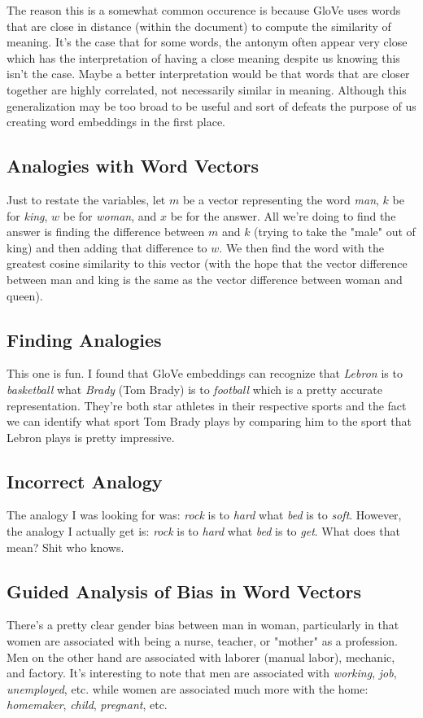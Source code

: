 \documentclass[12pt]{article}
\begin{document}
The reason this is a somewhat common occurence is because GloVe uses words that are close in distance 
(within the document) to compute the similarity of meaning. It's the case that for some words, the antonym 
often appear very close which has the interpretation of having a close meaning despite us knowing this isn't
the case. Maybe a better interpretation would be that words that are closer together are highly correlated, 
not necessarily similar in meaning. Although this generalization may be too broad to be useful and 
sort of defeats the purpose of us creating word embeddings in the first place. 

\subsection{Analogies with Word Vectors}
Just to restate the variables, let $m$ be a vector representing the word \emph{man}, $k$ be for 
\emph{king}, $w$ be for \emph{woman}, and $x$ be for the answer. All we're doing to find the answer
is finding the difference between $m$ and $k$ (trying to take the "male" out of king) and then adding
that difference to $w$. We then find the word with the greatest
cosine similarity to this vector (with the hope that the vector difference between man and king is the 
same as the vector difference between woman and queen). 

\subsection{Finding Analogies}
This one is fun. I found that GloVe embeddings can recognize that \emph{Lebron} is to \emph{basketball}
what \emph{Brady} (Tom Brady) is to \emph{football} which is a pretty accurate representation. They're 
both star athletes in their respective sports and the fact we can identify what sport Tom Brady plays 
by comparing him to the sport that Lebron plays is pretty impressive. 

\subsection{Incorrect Analogy}
The analogy I was looking for was: \emph{rock} is to \emph{hard} what \emph{bed} is to \emph{soft}. 
However, the analogy I actually get is: \emph{rock} is to \emph{hard} what \emph{bed} is to \emph{get}.
What does that mean? Shit who knows. 

\subsection{Guided Analysis of Bias in Word Vectors}
There's a pretty clear gender bias between man in woman, particularly in that women are associated
with being a nurse, teacher, or "mother" as a profession. Men on the other hand are associated 
with laborer (manual labor), mechanic, and factory. It's interesting to note that men are associated 
with \emph{working}, \emph{job}, \emph{unemployed}, etc. while women are associated much more 
with the home: \emph{homemaker}, \emph{child}, \emph{pregnant}, etc. 
\end{document}
